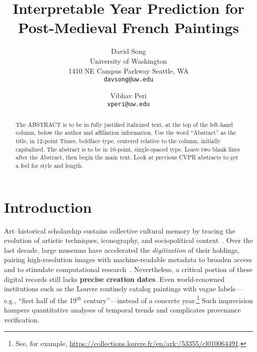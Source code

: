\documentclass[10pt,twocolumn,letterpaper]{article}
\begin{document}
\title{Interpretable Year Prediction for Post-Medieval French Paintings}

\author{David Song\\
University of Washington\\
1410 NE Campus Parkway Seattle, WA\\
{\tt\small davsong@uw.edu}
\and
Vibhav Peri\\
{\tt\small vperi@uw.edu}
}
\maketitle

\begin{abstract}
   The ABSTRACT is to be in fully justified italicized text, at the top of the left-hand column, below the author and affiliation information.
   Use the word ``Abstract'' as the title, in 12-point Times, boldface type, centered relative to the column, initially capitalized.
   The abstract is to be in 10-point, single-spaced type.
   Leave two blank lines after the Abstract, then begin the main text.
   Look at previous CVPR abstracts to get a feel for style and length.
\end{abstract}

\section{Introduction}
\label{sec:intro}

Art–historical scholarship sustains collective cultural memory by tracing the evolution of artistic techniques, iconography, and sociopolitical context~\cite{Gombrich1987}. Over the last decade, large museums have accelerated the \emph{digitization} of their holdings, pairing high-resolution images with machine-readable metadata to broaden access and to stimulate computational research~\cite{MetAPI2020,RijksAPI2014}. Nevertheless, a critical portion of these digital records still lacks \textbf{precise creation dates}. Even world-renowned institutions such as the Louvre routinely catalog paintings with vague labels—e.g., ``first half of the 19$^{\text{th}}$ century’’—instead of a concrete year.\footnote{See, for example, \url{https://collections.louvre.fr/en/ark:/53355/cl010064491}.} Such imprecision hampers quantitative analyses of temporal trends and complicates provenance verification.
\end{document}
